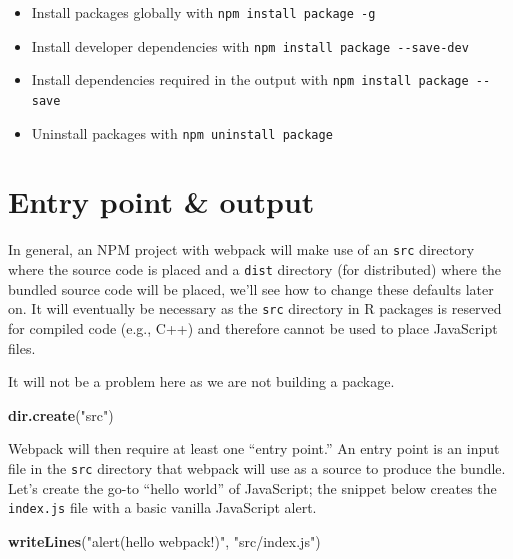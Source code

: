 \documentclass[
]{krantz}
\makeatletter
\newenvironment{Shaded}{\begin{snugshade}}{\end{snugshade}}
\newcommand{\KeywordTok}[1]{\textcolor[rgb]{0.27,0.27,0.27}{\textbf{#1}}}
\newcommand{\NormalTok}[1]{#1}
\newcommand{\StringTok}[1]{\textcolor[rgb]{0.5,0.5,0.5}{#1}}
\providecommand{\tightlist}{%
  \setlength{\itemsep}{0pt}\setlength{\parskip}{0pt}}
\newenvironment{kframe}{%
\medskip{}
\setlength{\fboxsep}{.8em}
 \def\at@end@of@kframe{}%
 \ifinner\ifhmode%
  \def\at@end@of@kframe{\end{minipage}}%
  \begin{minipage}{\columnwidth}%
 \fi\fi%
 \def\FrameCommand##1{\hskip\@totalleftmargin \hskip-\fboxsep
 \colorbox{shadecolor}{##1}\hskip-\fboxsep
     \hskip-\linewidth \hskip-\@totalleftmargin \hskip\columnwidth}%
 \MakeFramed {\advance\hsize-\width
   \@totalleftmargin\z@ \linewidth\hsize
   \@setminipage}}%
 {\par\unskip\endMakeFramed%
 \at@end@of@kframe}
\renewenvironment{Shaded}{\begin{kframe}}{\end{kframe}}
\makeatother
\begin{document}
\begin{itemize}
\tightlist
\item
  Install packages globally with \texttt{npm\ install\ package\ -g}
\item
  Install developer dependencies with \texttt{npm\ install\ package\ -\/-save-dev}
\item
  Install dependencies required in the output with \texttt{npm\ install\ package\ -\/-save}
\item
  Uninstall packages with \texttt{npm\ uninstall\ package}
\end{itemize}

\hypertarget{webpack-intro-entry-points}{%
\section{Entry point \& output}\label{webpack-intro-entry-points}}

In general, an NPM project with webpack will make use of an \texttt{src} directory where the source code is placed and a \texttt{dist} directory (for distributed) where the bundled source code will be placed, we'll see how to change these defaults later on. It will eventually be necessary as the \texttt{src} directory in R packages is reserved for compiled code (e.g., C++) and therefore cannot be used to place JavaScript files.

It will not be a problem here as we are not building a package.

\begin{Shaded}
\begin{Highlighting}[]
\KeywordTok{dir.create}\NormalTok{(}\StringTok{"src"}\NormalTok{)}
\end{Highlighting}
\end{Shaded}

Webpack will then require at least one ``entry point.'' An entry point is an input file in the \texttt{src} directory that webpack will use as a source to produce the bundle. Let's create the go-to ``hello world'' of JavaScript; the snippet below creates the \texttt{index.js} file with a basic vanilla JavaScript alert.

\begin{Shaded}
\begin{Highlighting}[]
\KeywordTok{writeLines}\NormalTok{(}\StringTok{"alert(\textquotesingle{}hello webpack!\textquotesingle{})"}\NormalTok{, }\StringTok{"src/index.js"}\NormalTok{) }
\end{Highlighting}
\end{Shaded}
\end{document}
